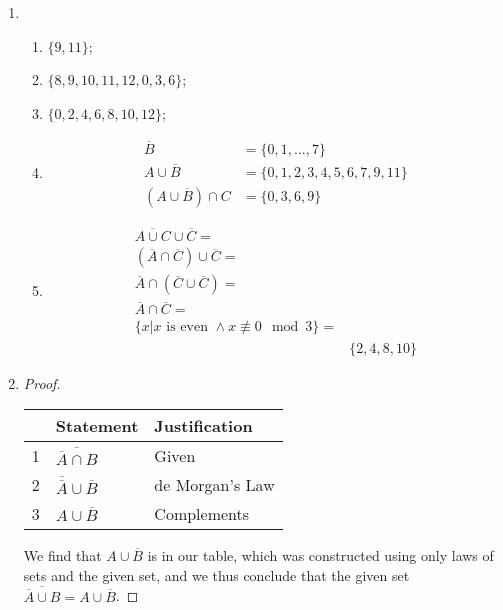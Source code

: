 \documentclass{article}
\begin{document}
\begin{enumerate}
    \item
        \begin{enumerate}
            \item $\{9,11\}$;
            \item $\{8, 9, 10, 11, 12, 0, 3, 6\}$;
            \item $\{0, 2,4,6,8,10,12\}$;
            \item
                \begin{align*}
                    \overline{B} &= \{0, 1, ..., 7\} \\
                    A \cup \overline{B} &= \{0,1,2,3,4,5,6,7,9,11\} \\
                    (A \cup \overline{B}) \cap C &= \{0, 3,6,9\}
                \end{align*}
            \item
                \begin{align*}
                    \overline{A \cup C} \cup \overline{C} = \\
                    (\overline{A} \cap \overline{C}) \cup \overline{C} = \\
                    \overline{A} \cap (\overline{C} \cup \overline{C}) = \\
                    \overline{A} \cap \overline{C} = \\
                    \{x | x \text{ is even } \land x \not\equiv 0 \mod{3}\} = \\
                    &\{2,4,8,10\}
                \end{align*}
        \end{enumerate}

    \item
        \begin{proof}

        \begin{tabular}{l | l | l}
            & Statement & Justification \\ \hline
            1 & $ \overline{\overline{A} \cap B}$ & Given \\
            2 & $ \overline{\overline{A}} \cup \overline{B}$ & de Morgan's Law \\
            3 & $ A \cup \overline{B} $ & Complements \\
        \end{tabular}

        We find that $A \cup \overline{B} $ is in our table, which was constructed using only laws of sets and the given set, and we thus conclude that the given set $\overline{\overline{A} \cup B} = A \cup \overline{B}$.
    \end{proof}


\end{enumerate}
\end{document}
